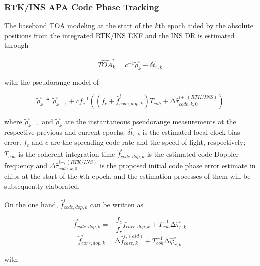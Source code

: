\documentclass{article}
\begin{document}
\subsubsection{RTK/INS APA Code Phase Tracking}
The baseband TOA modeling at the start of the $k$th epoch aided by the absolute positions from the integrated RTK/INS EKF and the INS DR is estimated through

\begin{equation}\label{GrindEQ__3_}
{\widehat{TOA}}^i_k=c^{-1}{\tilde{\rho }}^i_k-\delta {\hat{t}}_{r,k}
\end{equation}

with the pseudorange model of 

\begin{equation}\label{GrindEQ__4_}
{\tilde{\rho }}^i_k\triangleq {\tilde{\rho }}^i_{k-1}+cf^{-1}_c\left(\left(f_c+{\hat{f}}^i_{code,dop,k}\right)T_{coh}+\mathrm{\Delta }{\hat{\tau }}^{i+,\left(RTK/INS\right)}_{code,k,0}\right)
\end{equation}

where ${\tilde{\rho }}^i_{k-1}$ and ${\tilde{\rho }}^i_k$ are the instantaneous pseudorange measurements at the respective previous and current epochs; $\delta {\hat{t}}_{r,k}$ is the estimated local clock bias error; $f_c$ and $c$ are the spreading code rate and the speed of light, respectively; $T_{coh}$ is the coherent integration time ${\hat{f}}^i_{code,dop,k}$ is the estimated code Doppler frequency and ${\mathit{\Delta}\hat{\tau }}^{i+,\left(RTK/INS\right)}_{code,k,0}$ is the proposed initial code phase error estimate in chips at the start of the $k$th epoch, and the estimation processes of them will be subsequently elaborated. 

On the one hand, ${\hat{f}}^i_{code,dop,k}$ can be written as 

\begin{equation}\label{GrindEQ__5_}
{\hat{f}}^i_{code,dop,k}=-\frac{f_c}{f_r}{\tilde{f}}_{carr,dop,k}+T^{-1}_{coh}\mathrm{\Delta }{\hat{\tau }}^{i+}_{r,k}
\end{equation}
\begin{equation} \label{GrindEQ__6_}
{\tilde{f}}^i_{carr,dop,k}=\mathrm{\Delta }{\hat{f}}^{i,\left(aid\right)}_{carr,k}+T^{-1}_{coh}\mathrm{\Delta }{\hat{\varphi }}^{i+}_{r,k}
\end{equation}

with
\end{document}
